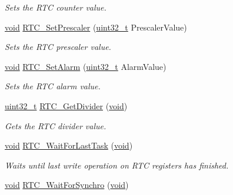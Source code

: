 \begin{DoxyCompactItemize}
\begin{DoxyCompactList}\small\item\em Sets the R\+TC counter value. \end{DoxyCompactList}\item 
\hyperlink{usb__devapi_8h_afabf60e7f57651d6d595a02c75f07cd0}{void} \hyperlink{group___r_t_c___exported___functions_gaf76be6071d1ba65b009e0791069e602c}{R\+T\+C\+\_\+\+Set\+Prescaler} (\hyperlink{_p_e___types_8h_a33594304e786b158f3fb30289278f5af}{uint32\+\_\+t} Prescaler\+Value)
\begin{DoxyCompactList}\small\item\em Sets the R\+TC prescaler value. \end{DoxyCompactList}\item 
\hyperlink{usb__devapi_8h_afabf60e7f57651d6d595a02c75f07cd0}{void} \hyperlink{group___r_t_c___exported___functions_gaec644c636a30ab5e287ba60ffc77132c}{R\+T\+C\+\_\+\+Set\+Alarm} (\hyperlink{_p_e___types_8h_a33594304e786b158f3fb30289278f5af}{uint32\+\_\+t} Alarm\+Value)
\begin{DoxyCompactList}\small\item\em Sets the R\+TC alarm value. \end{DoxyCompactList}\item 
\hyperlink{_p_e___types_8h_a33594304e786b158f3fb30289278f5af}{uint32\+\_\+t} \hyperlink{group___r_t_c___exported___functions_gaa4f00e0469fedcf6cbf23760e6d801ed}{R\+T\+C\+\_\+\+Get\+Divider} (\hyperlink{usb__devapi_8h_afabf60e7f57651d6d595a02c75f07cd0}{void})
\begin{DoxyCompactList}\small\item\em Gets the R\+TC divider value. \end{DoxyCompactList}\item 
\hyperlink{usb__devapi_8h_afabf60e7f57651d6d595a02c75f07cd0}{void} \hyperlink{group___r_t_c___exported___functions_gaa0a406ef860d5231748c5f0d82673036}{R\+T\+C\+\_\+\+Wait\+For\+Last\+Task} (\hyperlink{usb__devapi_8h_afabf60e7f57651d6d595a02c75f07cd0}{void})
\begin{DoxyCompactList}\small\item\em Waits until last write operation on R\+TC registers has finished. \end{DoxyCompactList}\item 
\hyperlink{usb__devapi_8h_afabf60e7f57651d6d595a02c75f07cd0}{void} \hyperlink{group___r_t_c___exported___functions_gaca4346e0dc15dccc15179786b28450db}{R\+T\+C\+\_\+\+Wait\+For\+Synchro} (\hyperlink{usb__devapi_8h_afabf60e7f57651d6d595a02c75f07cd0}{void})

\end{DoxyCompactItemize}
